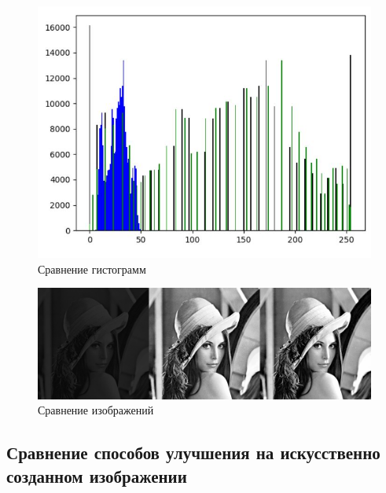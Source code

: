\begin{figure}[H]
	\begin{center}
		\includegraphics[scale=0.8]{hist_org.JPG}
		\caption{Сравнение гистограмм} 
		\label{pic:hist_linear} %
	\end{center}
\end{figure}
\begin{figure}[H]
	\begin{center}
		\includegraphics[scale=0.3]{rez.JPG}
		\caption{Сравнение изображений} 
		\label{pic:hist_linear} %
	\end{center}
\end{figure}

\subsection{Сравнение способов улучшения на искусственно созданном изображении}

